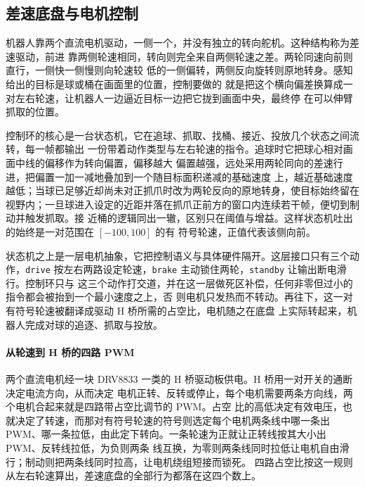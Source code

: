 \subsection{差速底盘与电机控制}\label{sec:chassis}

机器人靠两个直流电机驱动，一侧一个，并没有独立的转向舵机。这种结构称为差速驱动，前进
靠两侧轮速相同，转向则完全来自两侧轮速之差。两轮同速向前则直行，一侧快一侧慢则向轮速较
低的一侧偏转，两侧反向旋转则原地转身。感知给出的目标是球或桶在画面里的位置，控制要做的
就是把这个横向偏差换算成一对左右轮速，让机器人一边逼近目标一边把它拢到画面中央，最终停
在可以伸臂抓取的位置。


控制环的核心是一台状态机，它在追球、抓取、找桶、接近、投放几个状态之间流转，每一帧都输出
一份带着动作类型与左右轮速的指令。追球时它把球心相对画面中线的偏移作为转向偏置，偏移越大
偏置越强，远处采用两轮同向的差速行进，把偏置一加一减地叠加到一个随目标面积递减的基础速度
上，越近基础速度越低；当球已足够近却尚未对正抓爪时改为两轮反向的原地转身，使目标始终留在
视野内；一旦球进入设定的近距并落在抓爪正前方的窗口内连续若干帧，便切到制动并触发抓取。接
近桶的逻辑同出一辙，区别只在阈值与增益。这样状态机吐出的始终是一对范围在 $[-100, 100]$ 的有
符号轮速，正值代表该侧向前。

状态机之上是一层电机抽象，它把控制语义与具体硬件隔开。这层接口只有三个动作，\texttt{drive}
按左右两路设定轮速，\texttt{brake} 主动锁住两轮，\texttt{standby} 让输出断电滑行。控制环只与
这三个动作打交道，并在这一层做死区补偿，任何非零但过小的指令都会被抬到一个最小速度之上，否
则电机只发热而不转动。再往下，这一对有符号轮速被翻译成驱动 H 桥所需的占空比，电机随之在底盘
上实际转起来，机器人完成对球的追逐、抓取与投放。

\paragraph{从轮速到 H 桥的四路 PWM}
两个直流电机经一块 DRV8833 一类的 H 桥驱动板供电。H 桥用一对开关的通断决定电流方向，从而决定
电机正转、反转或停止，每个电机需要两条方向线，两个电机合起来就是四路带占空比调节的 PWM。占空
比的高低决定有效电压，也就决定了转速，而那对有符号轮速的符号则选定每个电机两条线中哪一条出
PWM、哪一条拉低，由此定下转向。一条轮速为正就让正转线按其大小出 PWM、反转线拉低，为负则两条
线互换，为零则两条线同时拉低让电机自由滑行；制动则把两条线同时拉高，让电机绕组短接而锁死。
四路占空比按这一规则从左右轮速算出，差速底盘的全部行为都落在这四个数上。

